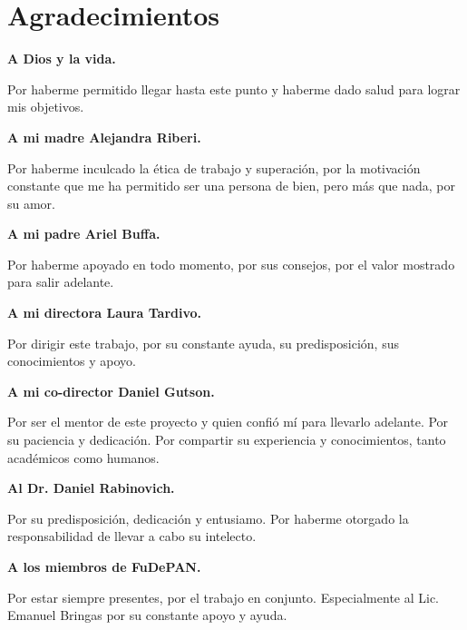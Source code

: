\chapter*{Agradecimientos} 



\par \textbf{A Dios y la vida.}
\par Por haberme permitido llegar hasta este punto y haberme dado salud para lograr mis objetivos. \\

\par \textbf{A mi madre Alejandra Riberi.}
\par Por haberme inculcado la ética de trabajo y superación, por la motivación constante que me ha permitido ser una persona de bien, pero más que nada, por su amor. \\

\par \textbf{A mi padre Ariel Buffa.}
\par Por haberme apoyado en todo momento, por sus consejos, por el valor mostrado para salir adelante. \\

\par \textbf{A mi directora Laura Tardivo.}
\par Por dirigir este trabajo, por su constante ayuda, su predisposición, sus conocimientos y apoyo. \\

\par \textbf{A mi co-director Daniel Gutson.}
\par Por ser el mentor de este proyecto y quien confió mí para llevarlo adelante. Por su paciencia y dedicación. Por compartir su experiencia y conocimientos, tanto académicos como humanos. \\

\par \textbf{Al Dr. Daniel Rabinovich.}
\par Por su predisposición, dedicación y entusiamo. Por haberme otorgado la responsabilidad de llevar a cabo su intelecto. \\

\par \textbf{A los miembros de FuDePAN.}
\par Por estar siempre presentes, por el trabajo en conjunto. Especialmente al Lic. Emanuel Bringas por su constante apoyo y ayuda. \\


